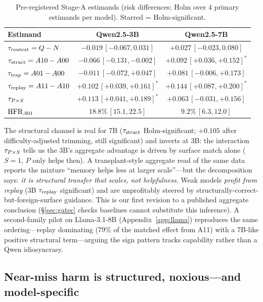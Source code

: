 \begin{table}[t]
\centering\small
\caption{Pre-registered Stage-A estimands (risk differences; Holm over 4 primary estimands per model). Starred = Holm-significant.}
\label{tab:estimands}
\begin{tabular}{lcc}
\toprule
Estimand & Qwen2.5-3B & Qwen2.5-7B \\
\midrule
$\tau_{\mathrm{context}} = Q-N$                 & $-0.019\,[-0.067,0.031]$ & $+0.027\,[-0.023,0.080]$ \\
$\tau_{\mathrm{struct}} = A10-A00$          & $-0.066\,[-0.131,-0.002]$       & $+0.092\,[+0.036,+0.152]^*$ \\
$\tau_{\mathrm{trap}} = A01-A00$            & $-0.011\,[-0.072,+0.047]$      & $+0.081\,[-0.006,+0.173]$ \\
$\tau_{\mathrm{replay}} = A11-A10$          & $+0.102\,[+0.039,+0.161]^*$    & $+0.144\,[+0.087,+0.200]^*$ \\
$\tau_{P\times S}$                       & $+0.113\,[+0.041,+0.189]^*$    & $+0.063\,[-0.031,+0.156]$ \\
$\mathrm{HFR}_{A01}$                    & $18.8\%\,[15.1,22.5]$          & $9.2\%\,[6.3,12.0]$ \\
\bottomrule
\end{tabular}
\end{table}

The structural channel is real for 7B ($\tau_{\mathrm{struct}}$ Holm-significant; $+0.105$ after difficulty-adjusted trimming, still significant) and inverts at 3B: the interaction $\tau_{P\times S}$ tells us the 3B's aggregate advantage is driven by surface match alone ($S{=}1$, $P$ only helps then). A transplant-style aggregate read of the same data \citep{feng2026transplants} reports the mixture ``memory helps less at larger scale''---but the decomposition says: \emph{it is structural transfer that scales, not helpfulness}. Weak models \emph{profit from replay} (3B $\tau_{\mathrm{replay}}$ significant) and are unprofitably steered by structurally-correct-but-foreign-surface guidance. This is our first revision to a published aggregate conclusion (\S\ref{sec:gatec} checks baselines cannot substitute this inference). A second-family pilot on Llama-3.1-8B (Appendix~\ref{app:llama}) reproduces the same ordering---replay dominating ($79\%$ of the matched effect from A11) with a 7B-like positive structural term---arguing the sign pattern tracks capability rather than a Qwen idiosyncrasy.

\subsection{Near-miss harm is structured, noxious---and model-specific}
\label{ssec:hf}

